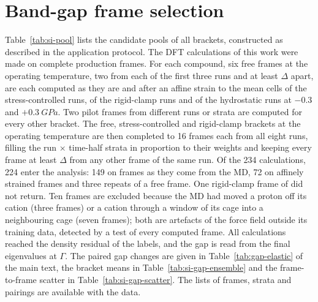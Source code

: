 

\section{Band-gap frame selection}
\label{si:gap}
Table~\ref{tab:si-pool} lists the candidate pools of all brackets, constructed as described in the
application protocol. The DFT calculations of this work were made on complete production frames. For
each compound, six free frames at the operating temperature, two from each of the first three runs and
at least $\Delta$ apart, are each computed as they are and after an affine strain to the mean cells of
the stress-controlled runs, of the rigid-clamp runs and of the hydrostatic runs at $-0.3$ and
$+\SI{0.3}{GPa}$. Two pilot frames from different runs or strata are computed for every other bracket.
The free, stress-controlled and rigid-clamp brackets at the operating temperature are then completed to
16 frames each from all eight runs, filling the run $\times$ time-half strata in proportion to their
weights and keeping every frame at least $\Delta$ from any other frame of the same run. Of the 234
calculations, 224 enter the analysis: 149 on frames as they come from the MD, 72 on affinely strained
frames and three repeats of a free frame. One rigid-clamp frame of \CsSnI{} did not return. Ten
\FASnI{} frames are excluded because the MD had moved a proton off its cation (three frames) or a
cation through a window of its cage into a neighbouring cage (seven frames); both are artefacts of
the force field outside its training data, detected by a test of every computed frame. All
calculations reached the density residual of the labels, and the gap is read from the final
eigenvalues at $\Gamma$. The paired gap changes are given in Table~\ref{tab:gap-elastic} of the main
text, the bracket means in Table~\ref{tab:si-gap-ensemble} and the frame-to-frame scatter in
Table~\ref{tab:si-gap-scatter}. The lists of frames, strata and pairings are available with the data.






